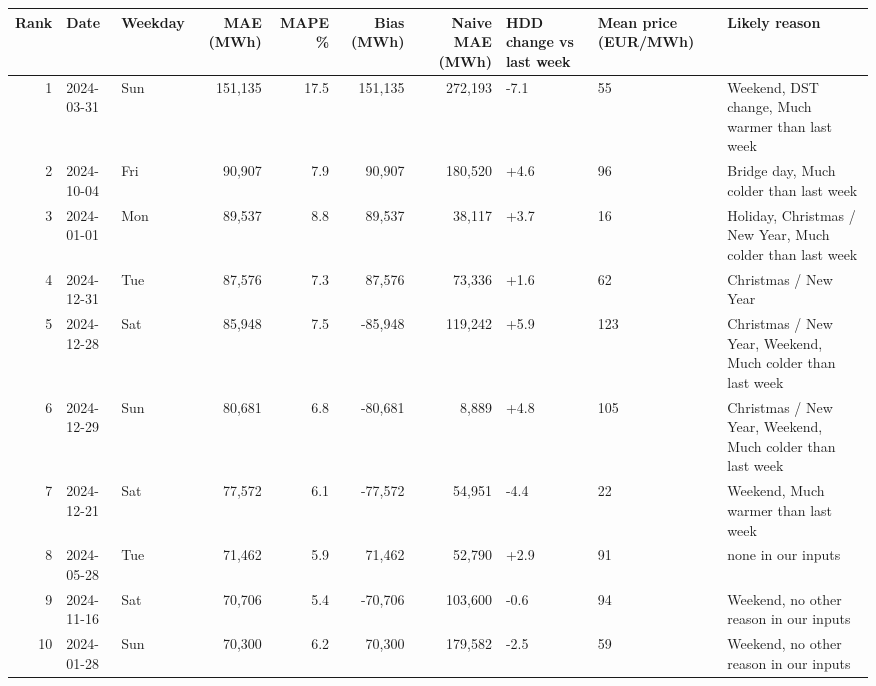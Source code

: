 \begin{tabular}{rllrrrrlll}
\toprule
Rank & Date & Weekday & MAE (MWh) & MAPE \% & Bias (MWh) & Naive MAE (MWh) & HDD change vs last week & Mean price (EUR/MWh) & Likely reason \\
\midrule
1 & 2024-03-31 & Sun & 151,135 & 17.5 & 151,135 & 272,193 & -7.1 & 55 & Weekend, DST change, Much warmer than last week \\
2 & 2024-10-04 & Fri & 90,907 & 7.9 & 90,907 & 180,520 & +4.6 & 96 & Bridge day, Much colder than last week \\
3 & 2024-01-01 & Mon & 89,537 & 8.8 & 89,537 & 38,117 & +3.7 & 16 & Holiday, Christmas / New Year, Much colder than last week \\
4 & 2024-12-31 & Tue & 87,576 & 7.3 & 87,576 & 73,336 & +1.6 & 62 & Christmas / New Year \\
5 & 2024-12-28 & Sat & 85,948 & 7.5 & -85,948 & 119,242 & +5.9 & 123 & Christmas / New Year, Weekend, Much colder than last week \\
6 & 2024-12-29 & Sun & 80,681 & 6.8 & -80,681 & 8,889 & +4.8 & 105 & Christmas / New Year, Weekend, Much colder than last week \\
7 & 2024-12-21 & Sat & 77,572 & 6.1 & -77,572 & 54,951 & -4.4 & 22 & Weekend, Much warmer than last week \\
8 & 2024-05-28 & Tue & 71,462 & 5.9 & 71,462 & 52,790 & +2.9 & 91 & none in our inputs \\
9 & 2024-11-16 & Sat & 70,706 & 5.4 & -70,706 & 103,600 & -0.6 & 94 & Weekend, no other reason in our inputs \\
10 & 2024-01-28 & Sun & 70,300 & 6.2 & 70,300 & 179,582 & -2.5 & 59 & Weekend, no other reason in our inputs \\
\bottomrule
\end{tabular}
